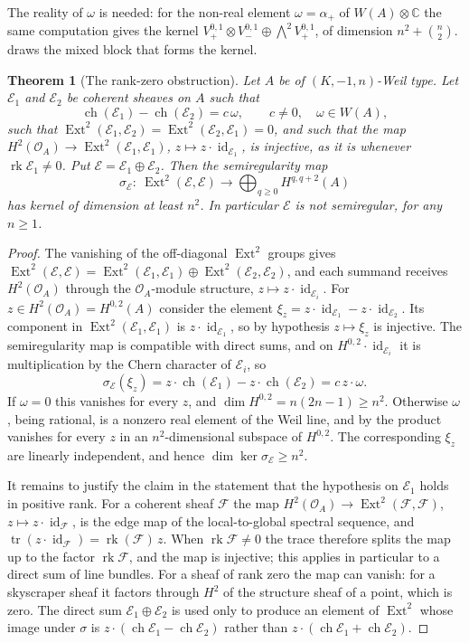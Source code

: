 \documentclass[11pt,reqno]{amsart}
\theoremstyle{plain}
\newtheorem{theorem}{Theorem}[section]
\theoremstyle{definition}
\theoremstyle{remark}
\newcommand{\CC}{\mathbb{C}}
\newcommand{\cF}{\mathcal{F}}
\newcommand{\cE}{\mathcal{E}}
\newcommand{\cO}{\mathcal{O}}
\newcommand{\HW}{W}                      %
\DeclareMathOperator{\ch}{ch}
\DeclareMathOperator{\rk}{rk}
\DeclareMathOperator{\Ext}{Ext}
\DeclareMathOperator{\id}{id}
\begin{document}
The reality of $\omega$ is needed: for the non-real element
$\omega=\alpha_{+}$ of $\HW(A)\otimes\CC$ the same computation gives the
kernel $V_{+}^{0,1}\otimes V_{-}^{0,1}\oplus\bigwedge^{2}V_{+}^{0,1}$, of
dimension $n^{2}+\binom{n}{2}$.  draws the mixed block that forms the kernel.

\begin{theorem}[The rank-zero obstruction]
\label{thm:rankzero}
Let $A$ be of $(K,-1,n)$-Weil type. Let $\cE_{1}$ and $\cE_{2}$ be coherent
sheaves on $A$ such that
\[
  \ch(\cE_{1})-\ch(\cE_{2})=c\,\omega,\qquad c\neq0,\quad \omega\in\HW(A),
\]
such that $\Ext^{2}(\cE_{1},\cE_{2})=\Ext^{2}(\cE_{2},\cE_{1})=0$, and such
that the map $H^{2}(\cO_{A})\to\Ext^{2}(\cE_{1},\cE_{1})$,
$z\mapsto z\cdot\id_{\cE_{1}}$, is injective, as it is whenever
$\rk\cE_{1}\neq0$. Put $\cE=\cE_{1}\oplus\cE_{2}$. Then the semiregularity
map
\[
  \sigma_{\cE}\colon\ \Ext^{2}(\cE,\cE)\longrightarrow\bigoplus_{q\ge0}H^{q,q+2}(A)
\]
has kernel of dimension at least $n^{2}$. In particular $\cE$ is not
semiregular, for any $n\ge1$.
\end{theorem}

\begin{proof}
The vanishing of the off-diagonal $\Ext^{2}$ groups gives
$\Ext^{2}(\cE,\cE)=\Ext^{2}(\cE_{1},\cE_{1})\oplus\Ext^{2}(\cE_{2},\cE_{2})$,
and each summand receives $H^{2}(\cO_{A})$ through the $\cO_{A}$-module
structure, $z\mapsto z\cdot\id_{\cE_{i}}$. For $z\in H^{2}(\cO_{A})=H^{0,2}(A)$
consider the element $\xi_{z}=z\cdot\id_{\cE_{1}}-z\cdot\id_{\cE_{2}}$. Its
component in $\Ext^{2}(\cE_{1},\cE_{1})$ is $z\cdot\id_{\cE_{1}}$, so by
hypothesis $z\mapsto\xi_{z}$ is injective. The semiregularity map is
compatible with direct sums, and on $H^{0,2}\cdot\id_{\cE_{i}}$ it is
multiplication by the Chern character of $\cE_{i}$, so
\[
  \sigma_{\cE}(\xi_{z})=z\cdot\ch(\cE_{1})-z\cdot\ch(\cE_{2})
  =c\,z\cdot\omega .
\]
If $\omega=0$ this vanishes for every $z$, and
$\dim H^{0,2}=n(2n-1)\ge n^{2}$. Otherwise $\omega$, being rational, is a
nonzero real element of the Weil line, and by  the
product vanishes for every $z$ in an $n^{2}$-dimensional subspace of
$H^{0,2}$. The corresponding $\xi_{z}$ are linearly independent, and hence
$\dim\ker\sigma_{\cE}\ge n^{2}$.

It remains to justify the claim in the statement that the hypothesis on
$\cE_{1}$ holds in positive rank. For a coherent sheaf $\cF$ the map
$H^{2}(\cO_{A})\to\Ext^{2}(\cF,\cF)$, $z\mapsto z\cdot\id_{\cF}$, is the edge
map of the local-to-global spectral sequence, and
$\operatorname{tr}(z\cdot\id_{\cF})=\rk(\cF)\,z$. When $\rk\cF\ne0$ the trace
therefore splits the map up to the factor $\rk\cF$, and the map is
injective; this applies in particular to a direct sum of line bundles. For a
sheaf of rank zero the map can vanish: for a skyscraper sheaf it factors
through $H^{2}$ of the structure sheaf of a point, which is zero. The direct
sum $\cE_{1}\oplus\cE_{2}$ is used only to produce an element of $\Ext^{2}$
whose image under $\sigma$ is $z\cdot(\ch\cE_{1}-\ch\cE_{2})$ rather than
$z\cdot(\ch\cE_{1}+\ch\cE_{2})$.
\end{proof}
\end{document}
